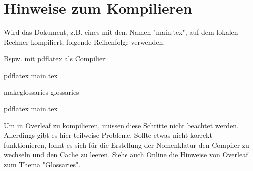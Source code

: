 \section{Hinweise zum Kompilieren}

Wird das Dokument, z.B. eines mit dem Namen "main.tex", auf dem lokalen Rechner kompiliert, folgende Reihenfolge  verwenden:

Bspw. mit pdflatex als Compilier:

pdflatex main.tex

makeglossaries glossaries

pdflatex main.tex

Um in Overleaf zu kompilieren, müssen diese Schritte nicht beachtet werden. Allerdings gibt es hier teilweise Probleme. Sollte etwas nicht korrekt funktionieren, lohnt es sich für die Erstellung der Nomenklatur den Compiler zu wechseln und den Cache zu leeren. Siehe auch Online die Hinweise von Overleaf zum Thema "Glossaries".

